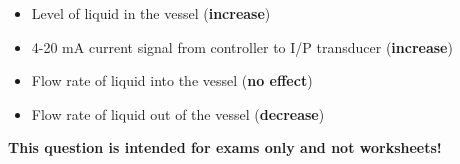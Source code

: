 
\begin{itemize}
\item{} Level of liquid in the vessel ({\bf increase})
\vskip 10pt
\item{} 4-20 mA current signal from controller to I/P transducer ({\bf increase})
\vskip 10pt
\item{} Flow rate of liquid into the vessel ({\bf no effect})
\vskip 10pt
\item{} Flow rate of liquid out of the vessel ({\bf decrease})
\end{itemize}







{\bf This question is intended for exams only and not worksheets!}



